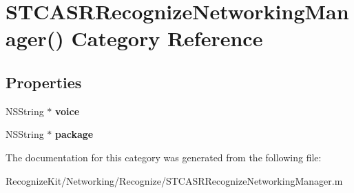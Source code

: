 \hypertarget{category_s_t_c_a_s_r_recognize_networking_manager_07_08}{}\section{S\+T\+C\+A\+S\+R\+Recognize\+Networking\+Manager() Category Reference}
\label{category_s_t_c_a_s_r_recognize_networking_manager_07_08}
\subsection*{Properties}
\begin{DoxyCompactItemize}
\item 
\hypertarget{category_s_t_c_a_s_r_recognize_networking_manager_07_08_a907514de0b338cdee97b86ffa65007af}{}\label{category_s_t_c_a_s_r_recognize_networking_manager_07_08_a907514de0b338cdee97b86ffa65007af} 
N\+S\+String $\ast$ {\bfseries voice}
\item 
\hypertarget{category_s_t_c_a_s_r_recognize_networking_manager_07_08_ac672695c5e6b70adfb4013ffd46d504c}{}\label{category_s_t_c_a_s_r_recognize_networking_manager_07_08_ac672695c5e6b70adfb4013ffd46d504c} 
N\+S\+String $\ast$ {\bfseries package}
\end{DoxyCompactItemize}


The documentation for this category was generated from the following file\+:\begin{DoxyCompactItemize}
\item 
Recognize\+Kit/\+Networking/\+Recognize/S\+T\+C\+A\+S\+R\+Recognize\+Networking\+Manager.\+m\end{DoxyCompactItemize}
